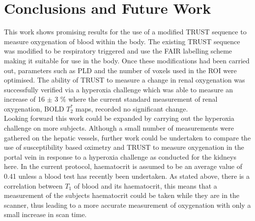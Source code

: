 \newpage
\section{Conclusions and Future Work}

This work shows promising results for the use of a modified \ac{TRUST} sequence to measure oxygenation of blood within the body. The existing \ac{TRUST} sequence was modified to be respiratory triggered and use the \ac{FAIR} labelling scheme making it suitable for use in the body. Once these modifications had been carried out, parameters such as \ac{PLD} and the number of voxels used in the \ac{ROI} were optimised. The ability of \ac{TRUST} to measure a change in renal oxygenation was successfully verified via a hyperoxia challenge which was able to measure an increase of 16 $\pm$ 3 \% where the current standard measurement of renal oxygenation, \ac{BOLD} $T_2^*$ maps, recorded no significant change.\\

Looking forward this work could be expanded by carrying out the hyperoxia challenge on more subjects. Although a small number of measurements were gathered on the hepatic vessels, further work could be undertaken to compare the use of susceptibility based oximetry and \ac{TRUST} to measure oxygenation in the portal vein in response to a hyperoxia challenge as conducted for the kidneys here. In the current protocol, haematocrit is assumed to be an average value of 0.41 unless a blood test has recently been undertaken. As stated above, there is a correlation between $T_1$ of blood and its haematocrit, this means that a measurement of the subjects haematocrit could be taken while they are in the scanner, thus leading to a more accurate measurement of oxygenation with only a small increase in scan time. 

